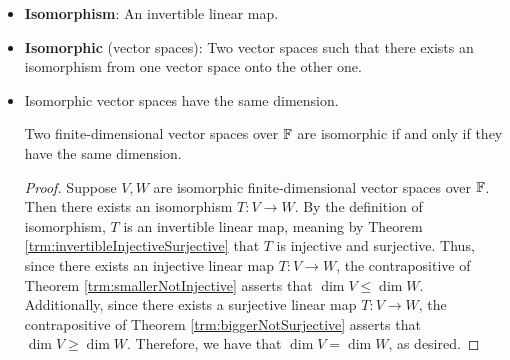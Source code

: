 \documentclass[../main.tex]{subfiles}
\begin{document}
\begin{itemize}
\begin{theorem}
\begin{proof}
            Now suppose that $T$ is injective and surjective. To prove that $T$ is invertible, we will define a function $S:W\to V$, prove that it is a linear map, prove that $TS=I_W$, and prove that $ST=I_V$. Let $Sw$ be the unique element of $V$ such that $T(Sw)=w$ (the surjectivity of $T$ guarantees that there exists \emph{an} element of $V$ that $T$ maps to $w$, and the injectivity of $T$ guarantees the uniqueness of said element).\par
            To prove that $S$ is a linear map, it will suffice to show that $S$ is additive and homogenous. To verify additivity, first note that the additivity of $T$ implies that
            \begin{equation*}
                T(Sw_1+Sw_2) = T(Sw_1)+T(Sw_2) = w_1+w_2
            \end{equation*}
            But since the above equation implies that $Sw_1+Sw_2$ is the unique element of $V$ that $T$ maps to $w_1+w_2$, we have by the definition of $S$ that $S(w_1+w_2)=Sw_1+Sw_2$. The proof is symmetric for homogeneity.\par
            To prove that $TS=I_W$, we need only appeal to the definition of $S$, which states that $(TS)w=T(Sw)=w$ for all $w\in W$. It immediately follows that $TS=I_W$.\par
            To prove that $ST=I_V$, first note that for all $v\in V$,
            \begin{equation*}
                T((ST)v) = (TS)(Tv) = I(Tv) = Tv
            \end{equation*}
            It follows by the injectivity of $T$ that $(ST)v=v$, i.e., that $ST=I_V$, as desired.
        \end{proof}
    \end{theorem}
    \item \textbf{Isomorphism}: An invertible linear map.
    \item \textbf{Isomorphic} (vector spaces): Two vector spaces such that there exists an isomorphism from one vector space onto the other one.
    \item Isomorphic vector spaces have the same dimension.
    \begin{theorem}\label{trm:dimIsomorphic}
        Two finite-dimensional vector spaces over $\mathbb{F}$ are isomorphic if and only if they have the same dimension.
        \begin{proof}
            Suppose $V,W$ are isomorphic finite-dimensional vector spaces over $\mathbb{F}$. Then there exists an isomorphism $T:V\to W$. By the definition of isomorphism, $T$ is an invertible linear map, meaning by Theorem \ref{trm:invertibleInjectiveSurjective} that $T$ is injective and surjective. Thus, since there exists an injective linear map $T:V\to W$, the contrapositive of Theorem \ref{trm:smallerNotInjective} asserts that $\dim V\leq\dim W$. Additionally, since there exists a surjective linear map $T:V\to W$, the contrapositive of Theorem \ref{trm:biggerNotSurjective} asserts that $\dim V\geq\dim W$. Therefore, we have that $\dim V=\dim W$, as desired.\par

\end{proof}
\end{theorem}
\end{itemize}
\end{document}

